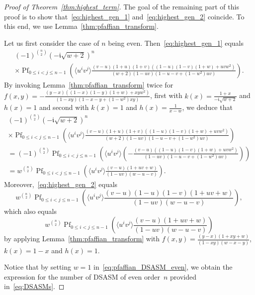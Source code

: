 \documentclass[ALCO, Unicode]{cedram}
\DeclareMathOperator*{\pf}{Pf}
\newcommand{\imag}{\mathfrak{i}}
\begin{document}
\begin{proof}[Proof of Theorem~\ref{thm:highest_term}]
		The goal of the remaining part of this proof is to show that~\eqref{eq:highest_gen_1} and~\eqref{eq:highest_gen_2} coincide. To this end, we use Lemma~\ref{thm:pfaffian_transform}.
		
		Let us first consider the case of $n$ being even. Then~\eqref{eq:highest_gen_1} equals
		\begin{multline*}
			(-1)^{\binom{n}{2}} (- \imag \sqrt{w+2})^n\\
			\times \pf_{0 \le i < j \le n-1} \left(\langle u^i v^j\rangle  \frac{(v-u)(1+u)(1+v)((1-u)(1-v)(1+w)+u v w^2)}{(w+2)(1-u v)(1-u-v+(1-w^2)u v)} \right).
		\end{multline*}
		By invoking Lemma~\ref{thm:pfaffian_transform} twice for $f(x,y)=- \frac{(y-x)((1-x)(1-y)(1+w)+x y w^2)}{(1-x y)(1-x-y+(1-w^2)x y)}$, first with $k(x)=\frac{1+x}{-\imag \sqrt{w+2}}$ and $h(x)=1$ and second with $k(x)=1$ and $h(x)=\frac{1}{x-w}$, we deduce that
		\begin{multline*}
			(-1)^{\binom{n}{2}} (- \imag \sqrt{w+2})^n\\
			\times \pf_{0 \le i < j \le n-1} \left(\langle u^i v^j\rangle  \frac{(v-u)(1+u)(1+v)((1-u)(1-v)(1+w)+u v w^2)}{(w+2)(1-u v)(1-u-v+(1-w^2)u v)} \right)\\
			= (-1)^{\binom{n}{2}} \pf_{0 \le i < j \le n-1} \left(\langle u^i v^j\rangle \left(- \frac{(v-u)((1-u)(1-v)(1+w)+u v w^2)}{(1-u v)(1-u-v+(1-w^2)u v)} \right)\right)\\
			= w^{\binom{n}{2}} \pf_{0 \le i < j \le n-1} \left(\langle u^i v^j\rangle \frac{(v-u)(1+u v+w)}{(1-u v)(w- u-v)} \right).
		\end{multline*}
		Moreover,~\eqref{eq:highest_gen_2} equals
		\begin{equation*}
			w^{\binom{n}{2}} \pf_{0 \le i < j \le n-1} \left(\langle u^i v^j\rangle   \frac{(v-u)(1-u)(1-v)(1+u v+w)}{(1-u v)(w- u-v)} \right),
		\end{equation*}
		which also equals
		\begin{equation}\label{eq:pfaffian_DSASM_even}
			w^{\binom{n}{2}} \pf_{0 \le i < j \le n-1} \left(\langle u^i v^j\rangle \frac{(v-u)(1+u v+w)}{(1-u v)(w- u-v)} \right)
		\end{equation}
		by applying Lemma~\ref{thm:pfaffian_transform} with $f(x,y)=\frac{(y-x)(1+x y+w)}{(1-x y)(w- x - y)}$, $k(x)=1-x$ and $h(x)=1$.
		
		Notice that by setting $w=1$ in~\eqref{eq:pfaffian_DSASM_even}, we obtain the expression for the number of DSASM of even order~$n$ provided in~\eqref{eq:DSASMs}.
		

\end{proof}
\end{document}
